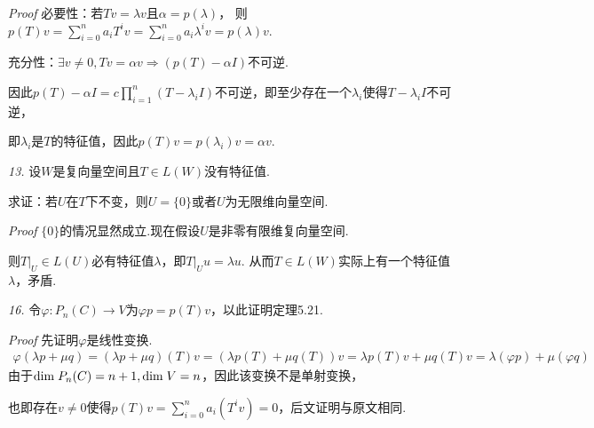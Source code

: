 \textit{Proof}
必要性：若\(Tv=\lambda v\)且\(\alpha=p(\lambda)\)，
则\(p(T)v=\sum_{i=0}^n a_iT^iv=\sum_{i=0}^n a_i\lambda^iv=p(\lambda)v\).

充分性：\(\exists v \ne 0,Tv=\alpha v \Rightarrow (p(T)-\alpha I)\)不可逆.

因此\(p(T)-\alpha I=c\prod_{i=1}^n (T-\lambda_i I)\)不可逆，即至少存在一个\(\lambda_i\)使得\(T-\lambda_i I\)不可逆，

即\(\lambda_i\)是\(T\)的特征值，因此\(p(T)v=p(\lambda_i)v=\alpha v\).

\hspace*{\fill}

\textit{13.}
设\(W\)是复向量空间且\(T \in L(W)\)没有特征值.

求证：若\(U\)在\(T\)下不变，则\(U=\{0\}\)或者\(U\)为无限维向量空间.

\textit{Proof}
\(\{0\}\)的情况显然成立.现在假设\(U\)是非零有限维复向量空间.

则\(T|_U \in L(U)\)必有特征值\(\lambda\)，即\(T|_U u=\lambda u\).
从而\(T \in L(W)\)实际上有一个特征值\(\lambda\)，矛盾.

\hspace*{\fill}

\textit{16.}
令\(\varphi:P_n(C) \rightarrow V\)为\(\varphi p=p(T)v\)，以此证明定理5.21.

\textit{Proof}
先证明\(\varphi\)是线性变换.
    \begin{align*}
        \varphi(\lambda p+\mu q)=(\lambda p+\mu q)(T)v=(\lambda p(T)+\mu q(T))v
        =\lambda p(T)v+\mu q(T)v=\lambda(\varphi p)+\mu(\varphi q)
    \end{align*}
由于\(\mathrm{dim \;} P_n(C)=n+1,\mathrm{dim \;} V=n\)，因此该变换不是单射变换，

也即存在\(v \ne 0\)使得\(p(T)v=\sum_{i=0}^n a_i(T^iv)=0\)，后文证明与原文相同.

